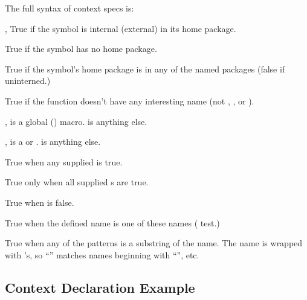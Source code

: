 The full syntax of context specs is:
\begin{Lentry}
  
\item[\kwd{internal}, \kwd{external}] True if the symbol is internal
  (external) in its home package.
  
\item[\kwd{uninterned}] True if the symbol has no home package.
  
\item[\code{\w{(:package \mstar{\var{package-name}})}}] True if the
  symbol's home package is in any of the named packages (false if
  uninterned.)
  
\item[\kwd{anonymous}] True if the function doesn't have any
  interesting name (not , , 
  or ).
  
\item[\kwd{macro}, \kwd{function}]  is a global
  () macro.   is anything else.
  
\item[\kwd{local}, \kwd{global}]  is a  or
  .   is anything else.
  
\item[\code{\w{(:or \mstar{\var{context-spec}})}}] True when any
  supplied  is true.
  
\item[\code{\w{(:and \mstar{\var{context-spec}})}}] True only when all
  supplied s are true.
  
\item[\code{\w{(:not \mstar{\var{context-spec}})}}] True when
   is false.
  
\item[\code{\w{(:member \mstar{\var{name}})}}] True when the defined
  name is one of these names ( test.)
  
\item[\code{\w{(:match \mstar{\var{pattern}})}}] True when any of the
  patterns is a substring of the name.  The name is wrapped with
  \code{\$}'s, so ``'' matches names beginning with
  ``'', etc.
\end{Lentry}


\subsection{Context Declaration Example}

